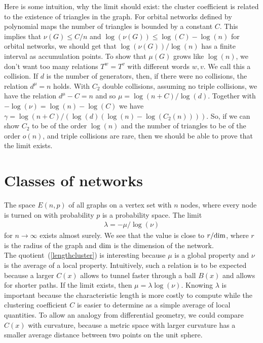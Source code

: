 \documentclass[12pt]{amsart}
\theoremstyle{definition}
\begin{document}
Here is some intuition, why the limit should exist: the cluster coefficient is related to the 
existence of triangles in the graph. For orbital networks \cite{KnillOrbital1,KnillOrbital2,KnillOrbital3}
defined by polynomial maps the number of triangles is bounded by a constant $C$. This implies that 
$\nu(G) \leq C/n$ and $\log(\nu(G)) \leq \log(C)-\log(n)$ for orbital networks, we should get that
$\log(\nu(G))/\log(n)$ has a finite interval as accumulation points. 
To show that $\mu(G)$ grows like $\log(n)$, we don't want 
too many relations $T^w=T^v$ with different words $w,v$. We call this a collision. 
If  $d$ is the number of generators, then, if there were no collisions, the relation
$d^\mu=n$ holds. With $C_2$ double collisions, assuming no triple collisions, we have
the relation $d^\mu-C=n$ and so $\mu = \log(n+C)/\log(d)$. Together with $-\log(\nu) = \log(n)-\log(C)$
we have $\gamma = \log(n+C)/(\log(d) (\log(n)-\log(C_2(n))))$. 
So, if we can show $C_2$ to be of the order $\log(n)$ and the number of triangles to be 
of the order $o(n)$, and triple collisions are rare, then we should be able to prove that the 
limit exists. 

\section{Classes of networks}

The space $E(n,p)$ of all graphs on a vertex set with $n$ nodes, where every node is turned on 
with probability $p$ is a probability space. The limit 
\begin{eqnarray*} 
 \label{lengthcluster}
  \lambda = -\mu/\log(\nu) 
\end{eqnarray*} 
for $n \to \infty$ exists almost surely. We see that the value is
close to $r/{\rm dim}$, where $r$ is the radius of the graph and ${\rm dim}$ is
the dimension of the network. \\

The quotient~(\ref{lengthcluster}) is interesting because 
$\mu$ is a global property and $\nu$ is the average of a local property. 
Intuitively, such a relation is to be expected because a larger $C(x)$ allows to tunnel 
faster through a ball $B(x)$ and allows for shorter paths. If the limit exists, 
then $\mu= \lambda \log(\nu)$.  
Knowing $\lambda$ is important because the characteristic length is more costly to compute 
while the clustering coefficient $C$ is easier to determine as a simple average 
of local quantities. 
To allow an analogy from differential geometry, we could compare $C(x)$ with curvature, because a 
metric space with larger curvature has a smaller 
average distance between two points on the unit sphere.  \\
\end{document}
